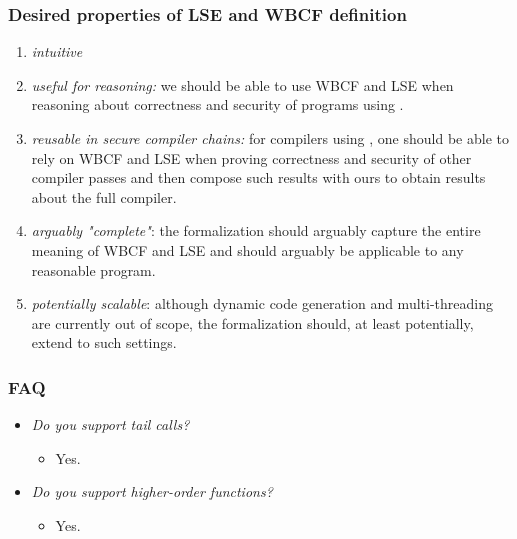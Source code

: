 \documentclass[aspectratio=169]{beamer}
\begin{document}
\begin{frame}
  \frametitle{Desired properties of LSE and WBCF definition}
  \begin{enumerate}
\item {\itshape intuitive} \label{def-prop:intuitive}
\item {\itshape useful for reasoning:} we should be able to use WBCF and LSE when reasoning about correctness and security of programs using \stktokens{}. \label{def-prop:useful}
\item {\itshape reusable in secure compiler chains:} for compilers using \stktokens{}, one should be able to rely on WBCF and LSE when proving correctness and security of other compiler passes and then compose such results with ours to obtain results about the full compiler.\label{def-prop:reusable}
\item {\itshape arguably "complete"}: the formalization should arguably capture the entire meaning of WBCF and LSE and should arguably be applicable to any reasonable program. \label{def-prop:complete}
\item {\itshape potentially scalable}: although dynamic code generation and multi-threading are currently out of scope, the formalization should, at least potentially, extend to such settings.\label{def-prop:scalable}
\end{enumerate}
\end{frame}

\begin{frame}
  \frametitle{FAQ}
  \begin{itemize}
  \item \textit{Do you support tail calls?}
    \begin{itemize}
    \item Yes.
    \end{itemize}
  \item \textit{Do you support higher-order functions?}
    \begin{itemize}
    \item Yes.
    \end{itemize}
  \end{itemize}
\end{frame}
\end{document}
